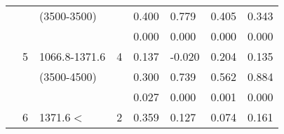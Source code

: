 \begin{table}[p]
\begin{tabular}{cclcllll}
                                                               &                                                                 & (3500-3500)                                                           &                                                                        &  0.400                                      & 0.779                                           & 0.405                                               & 0.343  \\ 
                                                               &                                                                 &                                                                                &                                                                        & 0.000                                       & 0.000                                           & 0.000                                               & 0.000  \\ \cline{5-8}\noalign{\smallskip}
                                                               & 5                                                              & 1066.8-1371.6                                                       & 4                                                                     & 0.137                                       & -0.020                                          & 0.204                                               & 0.135  \\ 
                                                               &                                                                 & (3500-4500)                                                           &                                                                        & 0.300                                       & 0.739                                           & 0.562                                               & 0.884  \\ 
                                                               &                                                                 &                                                                                &                                                                        & 0.027                                       & 0.000                                           & 0.001                                               & 0.000  \\ \cline{5-8}\noalign{\smallskip}
                                                               & 6                                                              & 1371.6$<$                                                             & 2                                                                     & 0.359                                       & 0.127                                           & 0.074                                               & 0.161  \\ 

\end{tabular}
\end{table}
